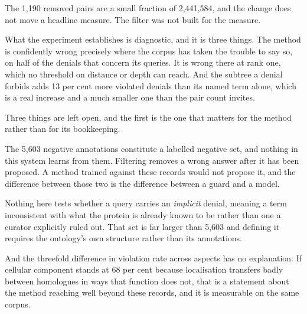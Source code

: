 The 1{,}190 removed pairs are a small fraction of 2{,}441{,}584, and the change does not
move a headline measure. The filter was not built for the measure.

What the experiment establishes is diagnostic, and it is three things. The method is
confidently wrong precisely where the corpus has taken the trouble to say so, on half
of the denials that concern its queries. It is wrong there at rank one, which no
threshold on distance or depth can reach. And the subtree a denial forbids adds 13 per
cent more violated denials than its named term alone, which is a real increase and a
much smaller one than the pair count invites.

Three things are left open, and the first is the one that matters for the method rather
than for its bookkeeping.

The 5{,}603 negative annotations constitute a labelled negative set, and nothing in this
system learns from them. Filtering removes a wrong answer after it has been proposed. A
method trained against these records would not propose it, and the difference between
those two is the difference between a guard and a model.

Nothing here tests whether a query carries an \emph{implicit} denial, meaning a term
inconsistent with what the protein is already known to be rather than one a curator
explicitly ruled out. That set is far larger than 5{,}603 and defining it requires the
ontology's own structure rather than its annotations.

And the threefold difference in violation rate across aspects has no explanation. If
cellular component stands at 68 per cent because localisation transfers badly between
homologues in ways that function does not, that is a statement about the method reaching
well beyond these records, and it is measurable on the same corpus.

